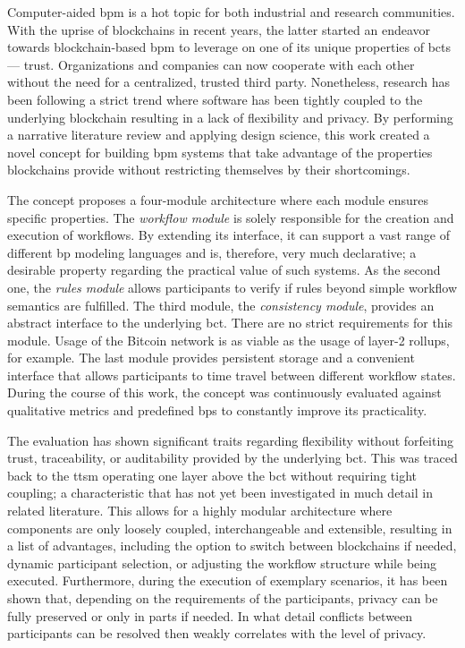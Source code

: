 \label{sec:conclusion}

Computer-aided \gls{bpm} is a hot topic for both industrial and research communities. With the uprise of blockchains in recent years, the latter started an endeavor towards blockchain-based \gls{bpm} to leverage on one of its unique properties of \glspl{bct} --- trust. Organizations and companies can now cooperate with each other without the need for a centralized, trusted third party. Nonetheless, research has been following a strict trend where software has been tightly coupled to the underlying blockchain resulting in a lack of flexibility and privacy. By performing a narrative literature review and applying design science, this work created a novel concept for building \gls{bpm} systems that take advantage of the properties blockchains provide without restricting themselves by their shortcomings.

The concept proposes a four-module architecture where each module ensures specific properties. The \textit{workflow module} is solely responsible for the creation and execution of workflows. By extending its interface, it can support a vast range of different \gls{bp} modeling languages and is, therefore, very much declarative; a desirable property regarding the practical value of such systems. As the second one, the \textit{rules module} allows participants to verify if rules beyond simple workflow semantics are fulfilled. The third module, the \textit{consistency module}, provides an abstract interface to the underlying \gls{bct}. There are no strict requirements for this module. Usage of the Bitcoin network is as viable as the usage of layer-2 rollups, for example. The last module provides persistent storage and a convenient interface that allows participants to time travel between different workflow states. During the course of this work, the concept was continuously evaluated against qualitative metrics and predefined \glspl{bp} to constantly improve its practicality.

The evaluation has shown significant traits regarding flexibility without forfeiting trust, traceability, or auditability provided by the underlying \gls{bct}. This was traced back to the \gls{ttsm} operating one layer above the \gls{bct} without requiring tight coupling; a characteristic that has not yet been investigated in much detail in related literature. This allows for a highly modular architecture where components are only loosely coupled, interchangeable and extensible, resulting in a list of advantages, including the option to switch between blockchains if needed, dynamic participant selection, or adjusting the workflow structure while being executed. Furthermore, during the execution of exemplary scenarios, it has been shown that, depending on the requirements of the participants, privacy can be fully preserved or only in parts if needed. In what detail conflicts between participants can be resolved then weakly correlates with the level of privacy.

